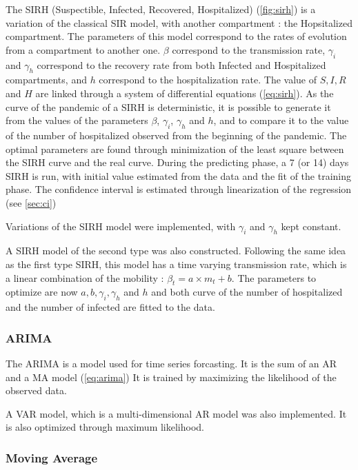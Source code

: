 The SIRH (Suspectible, Infected, Recovered, Hospitalized) (\ref{fig:sirh}) is a variation of the classical SIR model, with another compartment : the Hopsitalized compartment. 
The parameters of this model correspond to the rates of evolution from a compartment to another one. 
$\beta$ correspond to the transmission rate, $\gamma_i$ and $\gamma_h$ correspond to the recovery rate from both Infected and Hospitalized compartments, and $h$ correspond to the hospitalization rate. 
The value of $S, I, R$ and $H$ are linked through a system of differential equations (\ref{eq:sirh}). 
As the curve of the pandemic of a SIRH is deterministic, it is possible to generate it from the values of the parameters $\beta$, $\gamma_i$, $\gamma_h$ and $h$, and to compare it to the value of the number of hospitalized observed from the beginning of the pandemic.
The optimal parameters are found through minimization of the least square between the SIRH curve and the real curve. 
During the predicting phase, a 7 (or 14) days SIRH is run, with initial value estimated from the data and the fit of the training phase.
The confidence interval is estimated through linearization of the regression (see \ref{sec:ci})

Variations of the SIRH model were implemented, with $\gamma_i$ and $\gamma_h$ kept constant. 

A SIRH model of the second type was also constructed. 
Following the same idea as the first type SIRH, this model has a time varying transmission rate, which is a linear combination of the mobility : $\beta_t = a \times m_t + b$. 
The parameters to optimize are now $a, b, \gamma_i, \gamma_h$ and $h$ and both curve of the number of hospitalized and the number of infected are fitted to the data. 


\subsubsection{ARIMA}

The ARIMA is a model used for time series forcasting. 
It is the sum of an AR and a MA model (\ref{eq:arima})
It is trained by maximizing the likelihood of the observed data. 

A VAR model, which is a multi-dimensional AR model was also implemented. 
It is also optimized through maximum likelihood. 

\subsubsection{Moving Average}

